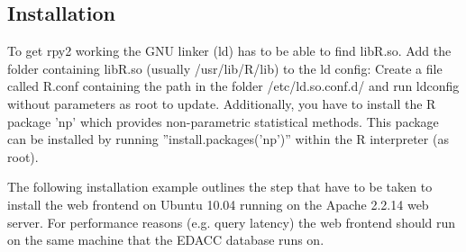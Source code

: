 \subsection{Installation}
\label{wf:installation}
To get rpy2 working the GNU linker (ld) has to be able to find libR.so. Add the folder containing
libR.so (usually /usr/lib/R/lib) to the ld config: Create a file called R.conf containing the
path in the folder /etc/ld.so.conf.d/ and run ldconfig without parameters as root to update.
Additionally, you have to install the R package 'np' which provides non-parametric statistical
methods. This package can be installed by running ''install.packages('np')'' within the R interpreter (as root).

The following installation example outlines the step that have to be taken to install the web frontend on Ubuntu 10.04
running on the Apache 2.2.14 web server. For performance reasons (e.g. query latency) the web frontend should run on the
same machine that the EDACC database runs on.
\marginlabel{\Eexample}
